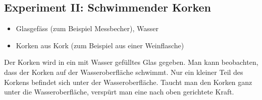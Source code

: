 \subsection*{Experiment II: Schwimmender Korken}
\begin{itemize}
	\item Glasgefäss (zum Beispiel Messbecher), Wasser
	\item Korken aus Kork (zum Beispiel aus einer Weinflasche)
\end{itemize}
Der Korken wird in ein mit Wasser gefülltes Glas gegeben. Man kann beobachten, dass der Korken auf der Wasseroberfläche schwimmt. 
Nur ein kleiner Teil des Korkens befindet sich unter der Wasseroberfläche.
Taucht man den Korken ganz unter die Wasseroberfläche, verspürt man eine nach oben gerichtete Kraft.


